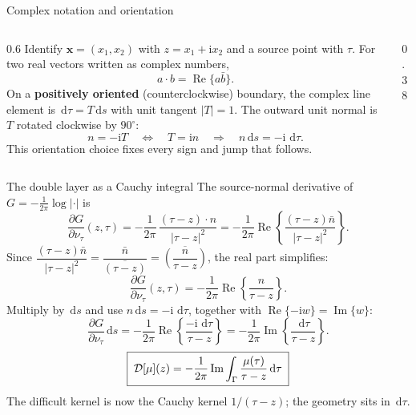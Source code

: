 \documentclass[aspectratio=169,11pt]{beamer}
\newcommand{\dd}{\,\mathrm d}
\newcommand{\ii}{\mathrm i}
\newcommand{\x}{\bm{x}}
\newcommand{\hl}[1]{{\color{CCMorange}\textbf{#1}}}
\begin{document}
\begin{frame}{Complex notation and orientation}
\small
\begin{columns}[T,totalwidth=\textwidth]
\begin{column}{0.6\textwidth}
Identify $\x=(x_1,x_2)$ with $z=x_1+\ii x_2$ and a source point with $\tau$.  For
two real vectors written as complex numbers,
\[
  a\cdot b=\operatorname{Re}\{a\bar b\}.
\]
On a \hl{positively oriented} (counterclockwise) boundary, the complex line
element is $\dd\tau=T\dd s$ with unit tangent $|T|=1$.  The outward unit normal
is $T$ rotated clockwise by $90^\circ$:
\[
  n=-\ii T
  \quad\Longleftrightarrow\quad
  T=\ii n
  \quad\Longrightarrow\quad
  n\dd s=-\ii\,\dd\tau.
\]
This orientation choice fixes every sign and jump that follows.
\end{column}
\begin{column}{0.38\textwidth}
\begin{center}
\end{center}
\end{column}
\end{columns}
\end{frame}

\begin{frame}{The double layer as a Cauchy integral}
\small
The source-normal derivative of $G=-\tfrac{1}{2\pi}\log|\cdot|$ is
\[
  \frac{\partial G}{\partial\nu_\tau}(z,\tau)
  =-\frac{1}{2\pi}\,\frac{(\tau-z)\cdot n}{|\tau-z|^2}
  =-\frac{1}{2\pi}\operatorname{Re}\!\left\{\frac{(\tau-z)\bar n}{|\tau-z|^2}\right\}.
\]
Since $\dfrac{(\tau-z)\bar n}{|\tau-z|^2}=\dfrac{\bar n}{\overline{(\tau-z)}}
=\overline{\left(\dfrac{n}{\tau-z}\right)}$, the real part simplifies:
\[
  \frac{\partial G}{\partial\nu_\tau}(z,\tau)
  =-\frac{1}{2\pi}\operatorname{Re}\!\left\{\frac{n}{\tau-z}\right\}.
\]
Multiply by $\dd s$ and use $n\dd s=-\ii\,\dd\tau$, together with
$\operatorname{Re}\{-\ii w\}=\operatorname{Im}\{w\}$:
\[
  \frac{\partial G}{\partial\nu_\tau}\dd s
  =-\frac{1}{2\pi}\operatorname{Re}\!\left\{\frac{-\ii\,\dd\tau}{\tau-z}\right\}
  =-\frac{1}{2\pi}\operatorname{Im}\!\left\{\frac{\dd\tau}{\tau-z}\right\}.
\]
\[
  \boxed{\;
  \Dop[\mu](z)
  =-\frac{1}{2\pi}\operatorname{Im}\int_\Gamma\frac{\mu(\tau)}{\tau-z}\dd\tau
  \;}
\]
The difficult kernel is now the Cauchy kernel $1/(\tau-z)$; the geometry sits in
$\dd\tau$.
\end{frame}
\end{document}
